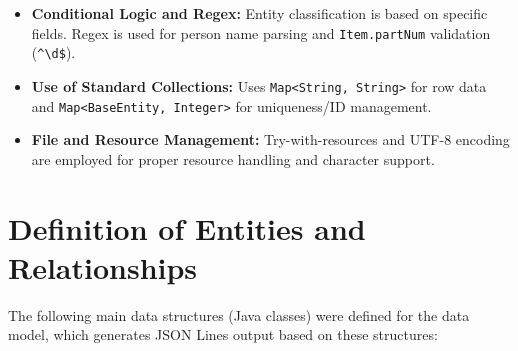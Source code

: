 \documentclass[11pt, a4paper]{article}
\begin{document}
\begin{itemize}
    \item \textbf{Conditional Logic and Regex:} Entity classification is based on specific fields. Regex is used for person name parsing and \texttt{Item.partNum} validation (\texttt{\^{}\textbackslash{}d\$}).

    \item \textbf{Use of Standard Collections:} Uses \texttt{Map<String, String>} for row data and \texttt{Map<BaseEntity, Integer>} for uniqueness/ID management.

    \item \textbf{File and Resource Management:} Try-with-resources and UTF-8 encoding are employed for proper resource handling and character support.
\end{itemize}

\section{Definition of Entities and Relationships}
The following main data structures (Java classes) were defined for the data model, which generates JSON Lines output based on these structures:
\end{document}
